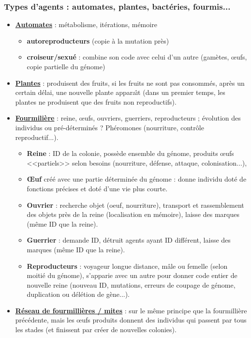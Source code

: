 \documentclass[11pt,twoside,a4paper]{article}
\begin{document}
\clearpage

\subsubsection{Types d'agents : automates, plantes, bact{\'e}ries, fourmis...}

\begin{itemize}
	\item \underline{\textbf{Automates}} : m{\'e}tabolisme, it{\'e}rations, m{\'e}moire
	\begin{itemize}
		\item \textbf{autoreproducteurs} (copie {\`a} la mutation pr{\`e}s)
		\item \textbf{croiseur/sexu{\'e}} : combine son code avec celui d'un autre (gam{\`e}tes, \oe ufs, copie partielle du g{\'e}nome)
	\end{itemize}

	\item \underline{\textbf{Plantes}} : produisent des fruits, si les fruits ne sont pas consomm{\'e}s, apr{\`e}s un certain d{\'e}lai, une nouvelle plante appara{\^\i}t (dans un premier temps, les plantes ne produisent que des fruits non reproductifs). 

	\item \underline{\textbf{Fourmili{\`e}re}} : reine, \oe ufs, ouvriers, guerriers, reproducteurs ; {\'e}volution des individus ou pr{\'e}-d{\'e}termin{\'e}s ? Ph{\'e}romones (nourriture, contr{\^o}le reproductif...). 
	\begin{itemize}
		\item \textbf{Reine} : ID de la colonie, poss{\`e}de ensemble du g{\'e}nome, produits \oe ufs <<partiels>> selon besoins (nourriture, d{\'e}fense, attaque, colonisation...), 
		\item \textbf{\OE uf} cr{\'e}{\'e} avec une partie d{\'e}termin{\'e}e du g{\'e}nome : donne individu dot{\'e} de fonctions pr{\'e}cises et dot{\'e} d'une vie plus courte. 
		\item \textbf{Ouvrier} : recherche objet (oeuf, nourriture), transport et rassemblement des objets pr{\`e}s de la reine (localisation en m{\'e}moire), laisse des marques (m{\^e}me ID que la reine). 
		\item \textbf{Guerrier} : demande ID, d{\'e}truit agents ayant ID diff{\'e}rent, laisse des marques (m{\^e}me ID que la reine). 
		\item \textbf{Reproducteurs} : voyageur longue distance, m{\^a}le ou femelle (selon moiti{\'e} du g{\'e}nome), s'apparie avec un autre pour donner code entier de nouvelle reine (nouveau ID, mutations, erreurs de coupage de g{\'e}nome, duplication ou d{\'e}l{\'e}tion de g{\`e}ne...). 
	\end{itemize}

	\item \underline{\textbf{R{\'e}seau de fourmilli{\`e}res / mites}} : sur le m{\^e}me principe que la fourmilli{\`e}re pr{\'e}c{\'e}dente, mais les \oe ufs produits donnent des individus qui passent par tous les stades (et finissent par cr{\'e}er de nouvelles colonies).~\\
\end{itemize}
\end{document}
